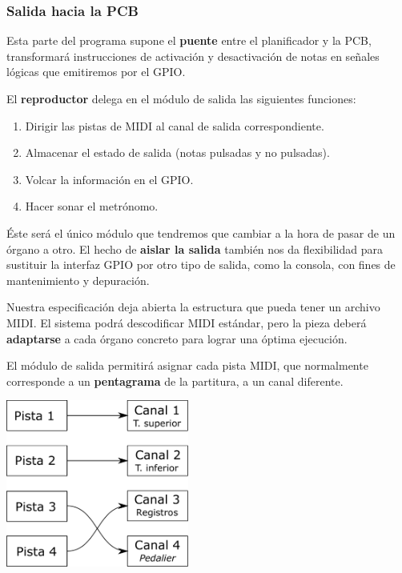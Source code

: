 \documentclass[10pt,a4paper]{article}
\begin{document}
	\subsubsection*{Salida hacia la PCB}
	
	Esta parte del programa supone el \textbf{puente} entre el planificador y la PCB, transformará instrucciones de activación y desactivación de notas en señales lógicas que emitiremos por el GPIO. 
	
	\clearpage
	
	El \textbf{reproductor} delega en el módulo de salida las siguientes funciones:
	
	\begin{enumerate}
		\item Dirigir las pistas de MIDI al canal de salida correspondiente.
		\item Almacenar el estado de salida (notas pulsadas y no pulsadas).
		\item Volcar la información en el GPIO.
		\item Hacer sonar el metrónomo.
	\end{enumerate}
	
	Éste será el único módulo que tendremos que cambiar a la hora de pasar de un órgano a otro. El hecho de \textbf{aislar la salida} también nos da flexibilidad para sustituir la interfaz GPIO por otro tipo de salida, como la consola, con fines de mantenimiento y depuración.
	
	\begin{multicols}{2}
		Nuestra especificación deja abierta la estructura que pueda tener un archivo MIDI. El sistema podrá descodificar MIDI estándar, pero la pieza deberá \textbf{adaptarse} a cada órgano concreto para lograr una óptima ejecución.
		
		El módulo de salida permitirá asignar cada pista MIDI, que normalmente corresponde a un \textbf{pentagrama} de la partitura, a un canal diferente.
		\columnbreak
		\begin{center}
			\includegraphics[width=0.45\textwidth]{images/map} 
		\end{center}
	\end{multicols}
	
\end{document}
